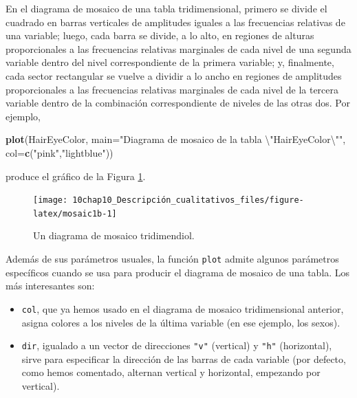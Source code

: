 \documentclass[
]{book}
\newenvironment{Shaded}{\begin{snugshade}}{\end{snugshade}}
\newcommand{\CharTok}[1]{\textcolor[rgb]{0.31,0.60,0.02}{#1}}
\newcommand{\DataTypeTok}[1]{\textcolor[rgb]{0.13,0.29,0.53}{#1}}
\newcommand{\KeywordTok}[1]{\textcolor[rgb]{0.13,0.29,0.53}{\textbf{#1}}}
\newcommand{\NormalTok}[1]{#1}
\newcommand{\StringTok}[1]{\textcolor[rgb]{0.31,0.60,0.02}{#1}}
\providecommand{\tightlist}{%
  \setlength{\itemsep}{0pt}\setlength{\parskip}{0pt}}
\theoremstyle{definition}
\theoremstyle{definition}
\theoremstyle{definition}
\theoremstyle{remark}
\begin{document}
En el diagrama de mosaico de una tabla tridimensional, primero se divide el cuadrado en barras verticales de amplitudes iguales a las frecuencias relativas de una variable; luego, cada barra se divide, a lo alto, en regiones de alturas proporcionales a las frecuencias relativas marginales de cada nivel de una segunda variable dentro del nivel correspondiente de la primera variable; y, finalmente, cada sector rectangular se vuelve a dividir a lo ancho en regiones de amplitudes proporcionales a las frecuencias relativas marginales de cada nivel de la tercera variable dentro de la combinación correspondiente de niveles de las otras dos. Por ejemplo,

\begin{Shaded}
\begin{Highlighting}[]
\KeywordTok{plot}\NormalTok{(HairEyeColor,  }\DataTypeTok{main=}\StringTok{"Diagrama de mosaico de la tabla }\CharTok{\textbackslash{}"}\StringTok{HairEyeColor}\CharTok{\textbackslash{}"}\StringTok{"}\NormalTok{, }
     \DataTypeTok{col=}\KeywordTok{c}\NormalTok{(}\StringTok{"pink"}\NormalTok{,}\StringTok{"lightblue"}\NormalTok{))}
\end{Highlighting}
\end{Shaded}

produce el gráfico de la Figura \ref{fig:mosaic1b}.

\begin{figure}

{\centering \texttt{[image: 10chap10\_Descripción\_cualitativos\_files/figure-latex/mosaic1b-1]} 

}

\caption{Un diagrama de mosaico tridimendiol.}\label{fig:mosaic1b}
\end{figure}

Además de sus parámetros usuales, la función \texttt{plot} admite algunos parámetros específicos
cuando se usa para producir el diagrama de mosaico de una tabla. Los más interesantes son:

\begin{itemize}
\tightlist
\item
  \texttt{col}, que ya hemos usado en el diagrama de mosaico tridimensional anterior, asigna colores a los niveles de la última variable (en ese ejemplo, los sexos).
\item
  \texttt{dir}, igualado a un vector de direcciones \texttt{"v"} (vertical) y \texttt{"h"} (horizontal), sirve para especificar la dirección de las barras de cada variable (por defecto, como hemos comentado, alternan vertical y horizontal, empezando por vertical).
\end{itemize}
\end{document}
